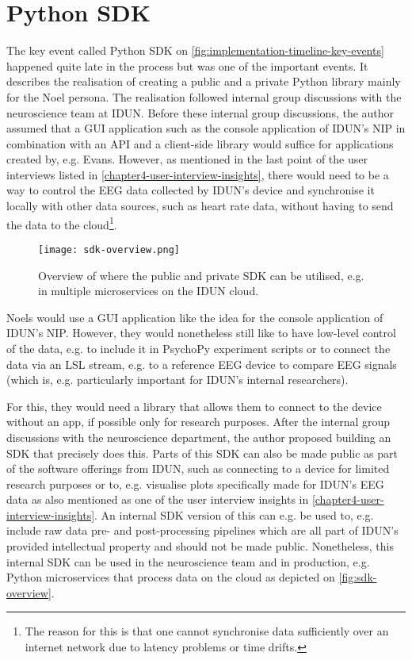 \section*{Python SDK}
\label{chapter4-python-sdk}

The key event called Python SDK on \autoref{fig:implementation-timeline-key-events} happened quite late in the process but was one of the important events. It describes the realisation of creating a public and a private Python library mainly for the Noel persona. The realisation followed internal group discussions with the neuroscience team at IDUN. Before these internal group discussions, the author assumed that a GUI application such as the console application of IDUN's NIP in combination with an API and a client-side library would suffice for applications created by, e.g. Evans. However, as mentioned in the last point of the user interviews listed in \autoref{chapter4-user-interview-insights}, there would need to be a way to control the EEG data collected by IDUN's device and synchronise it locally with other data sources, such as heart rate data, without having to send the data to the cloud\footnote{The reason for this is that one cannot synchronise data sufficiently over an internet network due to latency problems or time drifts.}.

\begin{figure}[ht]
  \centering
  \texttt{[image: sdk-overview.png]}
  \caption{Overview of where the public and private SDK can be utilised, e.g. in multiple microservices on the IDUN cloud.}
  \label{fig:sdk-overview}
\end{figure}

Noels would use a GUI application like the idea for the console application of IDUN's NIP. However, they would nonetheless still like to have low-level control of the data, e.g. to include it in PsychoPy experiment scripts or to connect the data via an LSL stream, e.g. to a reference EEG device to compare EEG signals (which is, e.g. particularly important for IDUN's internal researchers).

For this, they would need a library that allows them to connect to the device without an app, if possible only for research purposes. After the internal group discussions with the neuroscience department, the author proposed building an SDK that precisely does this. Parts of this SDK can also be made public as part of the software offerings from IDUN, such as connecting to a device for limited research purposes or to, e.g. visualise plots specifically made for IDUN's EEG data as also mentioned as one of the user interview insights in \autoref{chapter4-user-interview-insights}. An internal SDK version of this can e.g. be used to, e.g. include raw data pre- and post-processing pipelines which are all part of IDUN's provided intellectual property and should not be made public. Nonetheless, this internal SDK can be used in the neuroscience team and in production, e.g. Python microservices that process data on the cloud as depicted on \autoref{fig:sdk-overview}.

